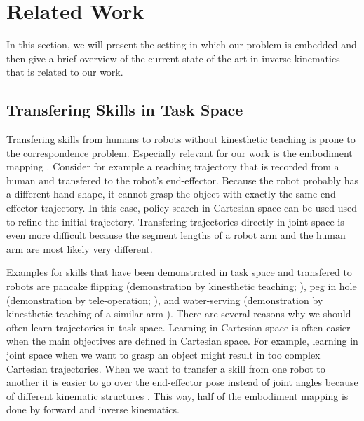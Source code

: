 \documentclass{article}
\begin{document}
\section{Related Work}

In this section, we will present the setting in which our problem is embedded
and then give a brief overview of the current state of the art in inverse
kinematics that is related to our work.

\subsection{Transfering Skills in Task Space}

Transfering skills from humans to robots without kinesthetic teaching
is prone to the correspondence problem. Especially relevant for our work
is the embodiment mapping \cite{Argall2009}. Consider for example a
reaching trajectory that is recorded from a human and transfered to the
robot's end-effector. Because the robot probably has a different hand shape,
it cannot grasp the object with exactly the same end-effector trajectory.
In this case, policy search in Cartesian space can be used used to refine the
initial trajectory.
Transfering trajectories directly in joint space is even more difficult
because the segment lengths of a robot arm and the human arm are most likely
very different.

Examples for skills that have been demonstrated in task space and transfered
to robots are pancake flipping (demonstration by kinesthetic teaching;
\cite{Kormushev2010}), peg in hole (demonstration by tele-operation;
\cite{Krueger2014}), and water-serving (demonstration by kinesthetic
teaching of a similar arm \cite{Pastor2009}).
There are several reasons why we should often learn trajectories in task space.
Learning in Cartesian space is often easier when the main objectives are
defined in Cartesian space. For example, learning in joint space when we want
to grasp an object might result in too complex Cartesian trajectories.
When we want to transfer a skill from one robot to another it is easier to
go over the end-effector pose instead of joint angles because of different
kinematic structures \cite{Pastor2009}. This way, half of the embodiment
mapping is done by forward and inverse kinematics.
\end{document}
